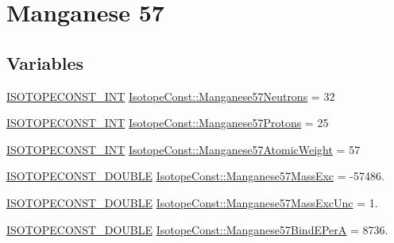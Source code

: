 \hypertarget{group___isotope_const-_manganese-_mn57}{}\section{Manganese 57}
\label{group___isotope_const-_manganese-_mn57}
\subsection*{Variables}
\begin{DoxyCompactItemize}
\item 
\mbox{\hyperlink{group___isotope_const-_macros_ga5f18360b3e99483a35c32d789e62621c}{I\+S\+O\+T\+O\+P\+E\+C\+O\+N\+S\+T\+\_\+\+I\+NT}} \mbox{\hyperlink{group___isotope_const-_manganese-_mn57_ga98f664ca2c97a4ee19776784ffabd7a8}{Isotope\+Const\+::\+Manganese57\+Neutrons}} = 32
\item 
\mbox{\hyperlink{group___isotope_const-_macros_ga5f18360b3e99483a35c32d789e62621c}{I\+S\+O\+T\+O\+P\+E\+C\+O\+N\+S\+T\+\_\+\+I\+NT}} \mbox{\hyperlink{group___isotope_const-_manganese-_mn57_gae1f6db9c7881873cd4a4f73291623415}{Isotope\+Const\+::\+Manganese57\+Protons}} = 25
\item 
\mbox{\hyperlink{group___isotope_const-_macros_ga5f18360b3e99483a35c32d789e62621c}{I\+S\+O\+T\+O\+P\+E\+C\+O\+N\+S\+T\+\_\+\+I\+NT}} \mbox{\hyperlink{group___isotope_const-_manganese-_mn57_ga367a06016a56807c3fc5fbd6d423af7f}{Isotope\+Const\+::\+Manganese57\+Atomic\+Weight}} = 57
\item 
\mbox{\hyperlink{group___isotope_const-_macros_ga8f45a7272ce02c0b4c65c44636ed719a}{I\+S\+O\+T\+O\+P\+E\+C\+O\+N\+S\+T\+\_\+\+D\+O\+U\+B\+LE}} \mbox{\hyperlink{group___isotope_const-_manganese-_mn57_ga9beaf1be14737e9d3e47f911e9daf162}{Isotope\+Const\+::\+Manganese57\+Mass\+Exc}} = -\/57486.
\item 
\mbox{\hyperlink{group___isotope_const-_macros_ga8f45a7272ce02c0b4c65c44636ed719a}{I\+S\+O\+T\+O\+P\+E\+C\+O\+N\+S\+T\+\_\+\+D\+O\+U\+B\+LE}} \mbox{\hyperlink{group___isotope_const-_manganese-_mn57_gaefec7c10a291804b7e082ca3660f467b}{Isotope\+Const\+::\+Manganese57\+Mass\+Exc\+Unc}} = 1.
\item 
\mbox{\hyperlink{group___isotope_const-_macros_ga8f45a7272ce02c0b4c65c44636ed719a}{I\+S\+O\+T\+O\+P\+E\+C\+O\+N\+S\+T\+\_\+\+D\+O\+U\+B\+LE}} \mbox{\hyperlink{group___isotope_const-_manganese-_mn57_gad12e2a1bc00a5067995208104ad597e0}{Isotope\+Const\+::\+Manganese57\+Bind\+E\+PerA}} = 8736.
\item 

\end{DoxyCompactItemize}
